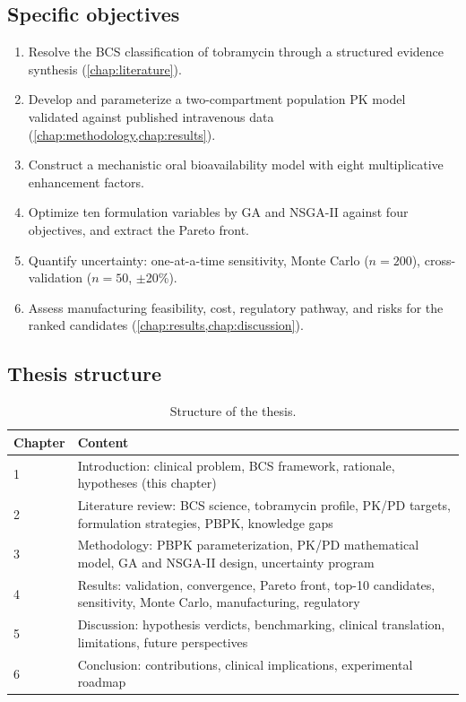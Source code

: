 \subsection{Specific objectives}
\begin{enumerate}
\item Resolve the BCS classification of tobramycin through a structured evidence synthesis (\cref{chap:literature}).
\item Develop and parameterize a two-compartment population PK model validated against published intravenous data (\cref{chap:methodology,chap:results}).
\item Construct a mechanistic oral bioavailability model with eight multiplicative enhancement factors.
\item Optimize ten formulation variables by GA and NSGA-II against four objectives, and extract the Pareto front.
\item Quantify uncertainty: one-at-a-time sensitivity, Monte Carlo ($n=200$), cross-validation ($n=50$, $\pm$20\%).
\item Assess manufacturing feasibility, cost, regulatory pathway, and risks for the ranked candidates (\cref{chap:results,chap:discussion}).
\end{enumerate}

\subsection{Thesis structure}
\begin{table}[htbp]
\centering
\caption{Structure of the thesis.}
\label{tab:structure}
\begin{tabular}{p{2.2cm}p{11.2cm}}
\toprule
Chapter & Content\\
\midrule
1 & Introduction: clinical problem, BCS framework, rationale, hypotheses (this chapter)\\
2 & Literature review: BCS science, tobramycin profile, PK/PD targets, formulation strategies, PBPK, knowledge gaps\\
3 & Methodology: PBPK parameterization, PK/PD mathematical model, GA and NSGA-II design, uncertainty program\\
4 & Results: validation, convergence, Pareto front, top-10 candidates, sensitivity, Monte Carlo, manufacturing, regulatory\\
5 & Discussion: hypothesis verdicts, benchmarking, clinical translation, limitations, future perspectives\\
6 & Conclusion: contributions, clinical implications, experimental roadmap\\
\bottomrule
\end{tabular}
\end{table}
